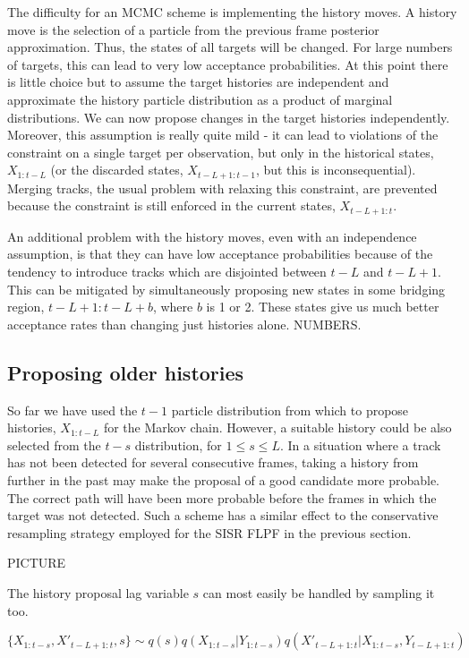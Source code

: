 The difficulty for an MCMC scheme is implementing the history moves. A history move is the selection of a particle from the previous frame posterior approximation. Thus, the states of all targets will be changed. For large numbers of targets, this can lead to very low acceptance probabilities. At this point there is little choice but to assume the target histories are independent and approximate the history particle distribution as a product of marginal distributions. We can now propose changes in the target histories independently. Moreover, this assumption is really quite mild - it can lead to violations of the constraint on a single target per observation, but only in the historical states, $X_{1:t-L}$ (or the discarded states, $X_{t-L+1:t-1}$, but this is inconsequential). Merging tracks, the usual problem with relaxing this constraint, are prevented because the constraint is still enforced in the current states, $X_{t-L+1:t}$.

An additional problem with the history moves, even with an independence assumption, is that they can have low acceptance probabilities because of the tendency to introduce tracks which are disjointed between $t-L$ and $t-L+1$. This can be mitigated by simultaneously proposing new states in some bridging region, $t-L+1:t-L+b$, where $b$ is 1 or 2. These states give us much better acceptance rates than changing just histories alone. NUMBERS.



\subsection{Proposing older histories}
So far we have used the $t-1$ particle distribution from which to propose histories, $X_{1:t-L}$ for the Markov chain. However, a suitable history could be also selected from the $t-s$ distribution, for $1 \le s \le L$. In a situation where a track has not been detected for several consecutive frames, taking a history from further in the past may make the proposal of a good candidate more probable. The correct path will have been more probable before the frames in which the target was not detected. Such a scheme has a similar effect to the conservative resampling strategy employed for the SISR FLPF in the previous section.

PICTURE

The history proposal lag variable $s$ can most easily be handled by sampling it too.

\begin{equation}
\{X_{1:t-s}, X'_{t-L+1:t}, s\} \sim q(s) q(X_{1:t-s}|Y_{1:t-s}) q(X'_{t-L+1:t}|X_{1:t-s}, Y_{t-L+1:t})
\label{eq:ExtendedFLProposal}
\end{equation}


